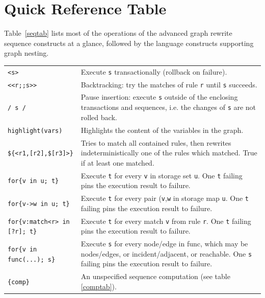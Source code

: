 \section{Quick Reference Table}

Table~\ref{seqtab} lists most of the operations of the advanced graph rewrite sequence constructs at a glance, followed by the language constructs supporting graph nesting.

\begin{table}[htbp]
\begin{minipage}{\linewidth} \renewcommand{\footnoterule}{} 
\begin{tabularx}{\linewidth}{|lX|}
\hline
\texttt{<s>}	& Execute \texttt{s} transactionally (rollback on failure).\\
\texttt{<<r;;s>>}	& Backtracking: try the matches of rule \texttt{r} until \texttt{s} succeeds.\\
\texttt{/ s /}	& Pause insertion: execute \texttt{s} outside of the enclosing transactions and sequences, i.e. the changes of \texttt{s} are not rolled back.\\
\hline
\texttt{highlight(vars)} & Highlights the content of the variables in the graph. \\
\hline
\texttt{\$\{<r1,[r2],\$[r3]>\}}	& Tries to match all contained rules, then rewrites indeterministically one of the rules which matched. True if at least one matched.\\
\hline
\texttt{for\{v in u; t\}}	& Execute \texttt{t} for every \texttt{v} in storage set \texttt{u}. One \texttt{t} failing pins the execution result to failure.\\
\texttt{for\{v->w in u; t\}}	& Execute \texttt{t} for every pair (\texttt{v},\texttt{w} in storage map \texttt{u}. One \texttt{t} failing pins the execution result to failure.\\
\texttt{for\{v:match<r> in [?r]; t\}}	& Execute \texttt{t} for every match \texttt{v} from rule \texttt{r}. One \texttt{t} failing pins the execution result to failure.\\
\texttt{for\{v in func(...); s\}}	& Execute \texttt{s} for every node/edge in func, which may be nodes/edges, or incident/adjacent, or reachable. One \texttt{s} failing pins the execution result to failure.\\
\hline
\texttt{\{comp\}}	& An unspecified sequence computation (see table \ref{comptab}).\\

\end{tabularx}
\end{minipage}
\end{table}
